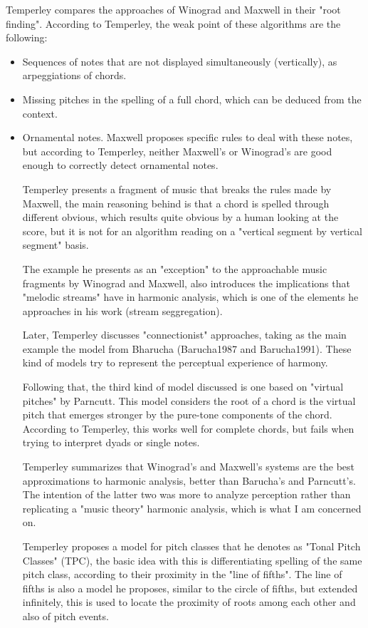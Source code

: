		Temperley compares the approaches of Winograd and Maxwell in their "root finding". According to Temperley, the weak point of these algorithms are the following:

		\begin{itemize}
			\item Sequences of notes that are not displayed simultaneously (vertically), as arpeggiations of chords.
			\item Missing pitches in the spelling of a full chord, which can be deduced from the context.
			\item Ornamental notes. Maxwell proposes specific rules to deal with these notes, but according to Temperley, neither Maxwell’s or Winograd’s are good enough to correctly detect ornamental notes.

			Temperley presents a fragment of music that breaks the rules made by Maxwell, the main reasoning behind is that a chord is spelled through different obvious, which results quite obvious by a human looking at the score, but it is not for an algorithm reading on a "vertical segment by vertical segment" basis.

			The example he presents as an "exception" to the approachable music fragments by Winograd and Maxwell, also introduces the implications that "melodic streams" have in harmonic analysis, which is one of the elements he approaches in his work (stream seggregation).

			Later, Temperley discusses "connectionist" approaches, taking as the main example the model from Bharucha (Barucha1987 and Barucha1991). These kind of models try to represent the perceptual experience of harmony.

			Following that, the third kind of model discussed is one based on "virtual pitches" by Parncutt. This model considers the root of a chord is the virtual pitch that emerges stronger by the pure-tone components of the chord. According to Temperley, this works well for complete chords, but fails when trying to interpret dyads or single notes.

			Temperley summarizes that Winograd's and Maxwell's systems are the best approximations to harmonic analysis, better than Barucha's and Parncutt's. The intention of the latter two was more to analyze perception rather than replicating a "music theory" harmonic analysis, which is what I am concerned on.

			Temperley proposes a model for pitch classes that he denotes as "Tonal Pitch Classes" (TPC), the basic idea with this is differentiating spelling of the same pitch class, according to their proximity in the "line of fifths". The line of fifths is also a model he proposes, similar to the circle of fifths, but extended infinitely, this is used to locate the proximity of roots among each other and also of pitch events.


\end{itemize}
